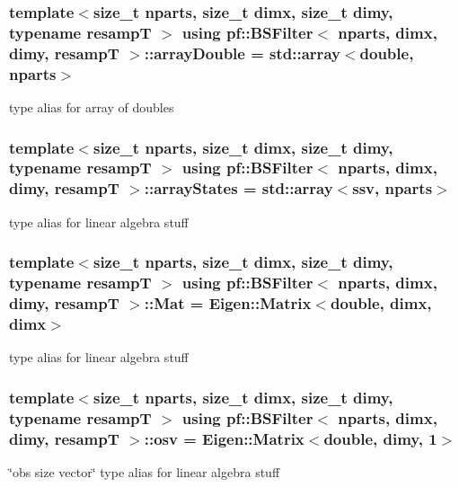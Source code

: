 \subsubsection[{\texorpdfstring{array\+Double}{arrayDouble}}]{\setlength{\rightskip}{0pt plus 5cm}template$<$size\+\_\+t nparts, size\+\_\+t dimx, size\+\_\+t dimy, typename resampT $>$ using {\bf pf\+::\+B\+S\+Filter}$<$ nparts, dimx, dimy, resampT $>$\+::{\bf array\+Double} =  std\+::array$<$double, nparts$>$}\hypertarget{classpf_1_1BSFilter_a770a16204c3c328cc15c5822f4687a8b}{}\label{classpf_1_1BSFilter_a770a16204c3c328cc15c5822f4687a8b}
type alias for array of doubles 
\subsubsection[{\texorpdfstring{array\+States}{arrayStates}}]{\setlength{\rightskip}{0pt plus 5cm}template$<$size\+\_\+t nparts, size\+\_\+t dimx, size\+\_\+t dimy, typename resampT $>$ using {\bf pf\+::\+B\+S\+Filter}$<$ nparts, dimx, dimy, resampT $>$\+::{\bf array\+States} =  std\+::array$<${\bf ssv}, nparts$>$}\hypertarget{classpf_1_1BSFilter_a567bc3c2a16c2a6f8b4673fe88ebbfda}{}\label{classpf_1_1BSFilter_a567bc3c2a16c2a6f8b4673fe88ebbfda}
type alias for linear algebra stuff 
\subsubsection[{\texorpdfstring{Mat}{Mat}}]{\setlength{\rightskip}{0pt plus 5cm}template$<$size\+\_\+t nparts, size\+\_\+t dimx, size\+\_\+t dimy, typename resampT $>$ using {\bf pf\+::\+B\+S\+Filter}$<$ nparts, dimx, dimy, resampT $>$\+::{\bf Mat} =  Eigen\+::\+Matrix$<$double, dimx, dimx$>$}\hypertarget{classpf_1_1BSFilter_a0fea63439948d095468ec14792abb396}{}\label{classpf_1_1BSFilter_a0fea63439948d095468ec14792abb396}
type alias for linear algebra stuff 
\subsubsection[{\texorpdfstring{osv}{osv}}]{\setlength{\rightskip}{0pt plus 5cm}template$<$size\+\_\+t nparts, size\+\_\+t dimx, size\+\_\+t dimy, typename resampT $>$ using {\bf pf\+::\+B\+S\+Filter}$<$ nparts, dimx, dimy, resampT $>$\+::{\bf osv} =  Eigen\+::\+Matrix$<$double, dimy, 1$>$}\hypertarget{classpf_1_1BSFilter_a46aaa88331b87e69ad3d1fcdc3b1db4e}{}\label{classpf_1_1BSFilter_a46aaa88331b87e69ad3d1fcdc3b1db4e}
\char`\"{}obs size vector\char`\"{} type alias for linear algebra stuff 
